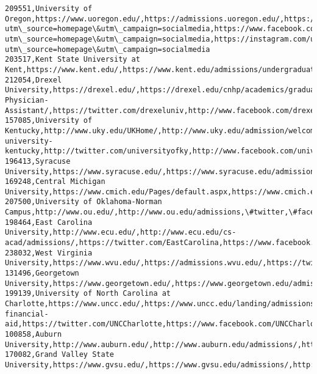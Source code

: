 \documentclass[11pt]{article}
\begin{document}
\begin{Verbatim}[commandchars=\\\{\}]
209551,University of Oregon,https://www.uoregon.edu/,https://admissions.uoregon.edu/,https://www.twitter.com/uoregon?utm\_source=homepage\&utm\_campaign=socialmedia,https://www.facebook.com/universityoforegon?utm\_source=homepage\&utm\_campaign=socialmedia,https://instagram.com/uoregon?utm\_source=homepage\&utm\_campaign=socialmedia
203517,Kent State University at Kent,https://www.kent.edu/,https://www.kent.edu/admissions/undergraduate,https://www.twitter.com/kentstate,https://www.facebook.com/kentstate,https://www.instagram.com/kentstate
212054,Drexel University,https://drexel.edu/,https://drexel.edu/cnhp/academics/graduate/MHS-Physician-Assistant/,https://twitter.com/drexeluniv,http://www.facebook.com/drexeluniv,http://instagram.com/drexeluniv
157085,University of Kentucky,http://www.uky.edu/UKHome/,http://www.uky.edu/admission/welcome-university-kentucky,http://twitter.com/universityofky,http://www.facebook.com/universityofky,https://www.instagram.com/universityofky/
196413,Syracuse University,https://www.syracuse.edu/,https://www.syracuse.edu/admissions/,https://twitter.com/SyracuseU,https://www.facebook.com/syracuseuniversity/,https://www.instagram.com/syracuseu/
169248,Central Michigan University,https://www.cmich.edu/Pages/default.aspx,https://www.cmich.edu/admissions/Pages/default.aspx,https://twitter.com/CMUniversity,https://www.facebook.com/cmich,http://instagram.com/cmuniversity/
207500,University of Oklahoma-Norman Campus,http://www.ou.edu/,http://www.ou.edu/admissions,\#twitter,\#facebook,https://www.instagram.com/uofoklahoma/
198464,East Carolina University,http://www.ecu.edu/,http://www.ecu.edu/cs-acad/admissions/,https://twitter.com/EastCarolina,https://www.facebook.com/EastCarolina,https://www.instagram.com/eastcarolinauniv/
238032,West Virginia University,https://www.wvu.edu/,https://admissions.wvu.edu/,https://twitter.com/WestVirginiaU/,http://www.facebook.com/wvumountaineers,https://instagram.com/westvirginiau/
131496,Georgetown University,https://www.georgetown.edu/,https://www.georgetown.edu/admissions,http://twitter.com/georgetown,http://www.facebook.com/georgetownuniv,https://instagram.com/georgetownuniversity/
199139,University of North Carolina at Charlotte,https://www.uncc.edu/,https://www.uncc.edu/landing/admissions-financial-aid,https://twitter.com/UNCCharlotte,https://www.facebook.com/UNCCharlotte,https://www.instagram.com/unccharlotte/
100858,Auburn University,http://www.auburn.edu/,http://www.auburn.edu/admissions/,http://twitter.com/auburnu,http://www.facebook.com/auburnu,https://instagram.com/auburnu
170082,Grand Valley State University,https://www.gvsu.edu/,https://www.gvsu.edu/admissions/,http://pic.twitter.com/D9RvJKQO8O,http://www.facebook.com/grandvalley,http://www.instagram.com/gvsu

\end{Verbatim}
\end{document}
